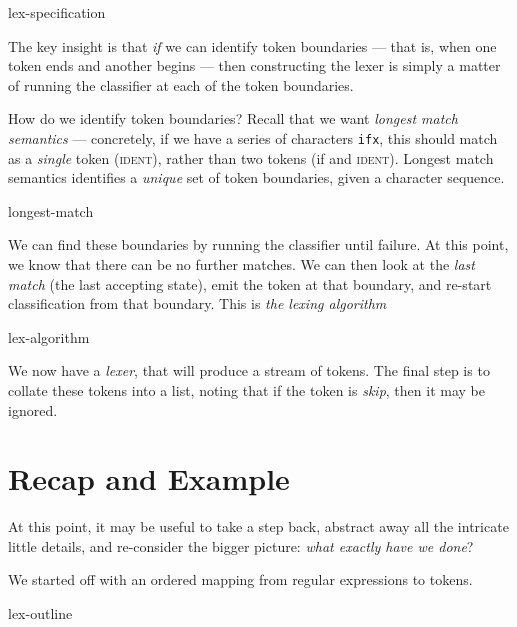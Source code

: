 \begin{center}
{lex-specification}
\end{center}

The key insight is that \emph{if} we can identify token boundaries --- that is, when one token ends and another begins --- then constructing the lexer is simply a matter of running the classifier at each of the token boundaries.

How do we identify token boundaries? Recall that we want \emph{longest match semantics} --- concretely, if we have a series of characters \texttt{ifx}, this should match as a \emph{single} token (\textsc{ident}), rather than two tokens (\textsf{if} and \textsc{ident}). Longest match semantics identifies a \emph{unique} set of token boundaries, given a character sequence. 

\begin{center}
\vspace{5mm}
{longest-match}
\end{center}

We can find these boundaries by running the classifier until failure. At this point, we know that there can be no further matches. We can then look at the \emph{last match} (the last accepting state), emit the token at that boundary, and re-start classification from that boundary. This is \emph{the lexing algorithm} 

\begin{center}
    \begin{minipage}{0.5\textwidth}
        {lex-algorithm}
    \end{minipage}
\end{center}

We now have a \emph{lexer}, that will produce a stream of tokens. The final step is to collate these tokens into a list, noting that if the token is \textit{skip}, then it may be ignored. 

\section{Recap and Example}
At this point, it may be useful to take a step back, abstract away all the intricate little details, and re-consider the bigger picture: \textit{what exactly have we done}?

We started off with an ordered mapping from regular expressions to tokens. 

\begin{center}
    {lex-outline}
\end{center}


